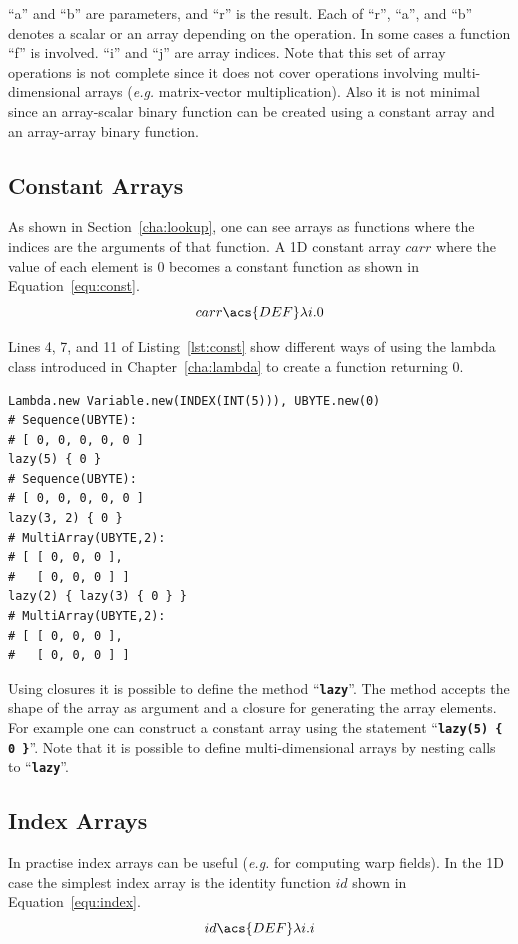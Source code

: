 \documentclass[12pt,a4paper,oneside,openright]{book}
\newcommand{\eg}{\emph{e.g.} }
\newcommand{\Eg}{For example }
\newcommand{\cha}[1]{Chapter~\ref{cha:#1}}
\newcommand{\sct}[1]{Section~\ref{cha:#1}}
\newcommand{\equ}[1]{Equation~\ref{equ:#1}}
\newcommand{\lst}[1]{Listing~\ref{lst:#1}}
\newcommand{\code}[1]{``\texttt{\textbf{\textcolor{codegray}{\small{#1}}}}''}
\begin{document}
\begin{CJK}{UTF8}{}
\begin{table}[t]
\begin{center}
\begin{tabular}{ll@{=}lc}
    \end{tabular}
  \end{center}
\end{table}
``a'' and ``b'' are parameters, and ``r'' is the result. Each of ``r'', ``a'', and ``b'' denotes a scalar or an array depending on the operation. In some cases a function ``f'' is involved. ``i'' and ``j'' are array indices. Note that this set of array operations is not complete since it does not cover operations involving multi-dimensional arrays (\eg matrix-vector multiplication). Also it is not minimal since an array-scalar binary function can be created using a constant array and an array-array binary function.

\subsection{Constant Arrays}\label{cha:const}
As shown in \sct{lookup}, one can see arrays as functions where the indices are the arguments of that function. A \ac{1D} constant array $carr$ where the value of each element is $0$ becomes a constant function as shown in \equ{const}.
\begin{equation}\label{equ:const}
  carr\acs{DEF}\lambda i.0
\end{equation}

Lines 4, 7, and 11 of \lst{const} show different ways of using the lambda class introduced in \cha{lambda} to create a function returning $0$.
\lstset{language=Ruby,frame=single,numbers=left}
\begin{lstlisting}[float=htbp,caption={Constant arrays},escapechar=\$,label=lst:const]
Lambda.new Variable.new(INDEX(INT(5))), UBYTE.new(0)
# Sequence(UBYTE):
# [ 0, 0, 0, 0, 0 ]
lazy(5) { 0 }
# Sequence(UBYTE):
# [ 0, 0, 0, 0, 0 ]
lazy(3, 2) { 0 }
# MultiArray(UBYTE,2):
# [ [ 0, 0, 0 ],
#   [ 0, 0, 0 ] ]
lazy(2) { lazy(3) { 0 } }
# MultiArray(UBYTE,2):
# [ [ 0, 0, 0 ],
#   [ 0, 0, 0 ] ]
\end{lstlisting}
Using closures it is possible to define the method \code{lazy}. The method accepts the shape of the array as argument and a closure for generating the array elements. \Eg one can construct a constant array using the statement \code{lazy(5) \{ 0 \}}. Note that it is possible to define multi-dimensional arrays by nesting calls to \code{lazy}.

\subsection{Index Arrays}
In practise index arrays can be useful (\eg for computing warp fields). In the \ac{1D} case the simplest index array is the identity function $id$ shown in \equ{index}.
\begin{equation}\label{equ:index}
  id\acs{DEF}\lambda i.i
\end{equation}


\end{CJK}
\end{document}
